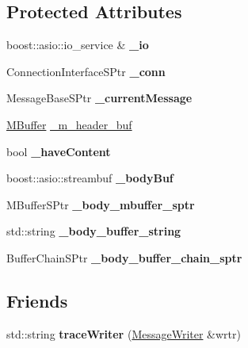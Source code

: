 \subsection*{Protected Attributes}
\begin{DoxyCompactItemize}
\item 
\mbox{\label{class_message_writer_aaf28fbb61f0fc9783fab731d12f06aed}} 
boost\+::asio\+::io\+\_\+service \& {\bfseries \+\_\+io}
\item 
\mbox{\label{class_message_writer_a2fa38a10a98a06bec22a59489f582965}} 
Connection\+Interface\+S\+Ptr {\bfseries \+\_\+conn}
\item 
\mbox{\label{class_message_writer_a6b04facc589bab6acca0c85ba5e481ef}} 
Message\+Base\+S\+Ptr {\bfseries \+\_\+current\+Message}
\item 
\hyperlink{struct_m_buffer}{M\+Buffer} \hyperlink{class_message_writer_a77fcbd1fa4556cb745536c5a1eee6d70}{\+\_\+m\+\_\+header\+\_\+buf}
\item 
\mbox{\label{class_message_writer_a8a3c2444eb3fd4634a8d1e286fce272d}} 
bool {\bfseries \+\_\+have\+Content}
\item 
\mbox{\label{class_message_writer_af0bccbe32eecf55f98461ffdd795aac3}} 
boost\+::asio\+::streambuf {\bfseries \+\_\+body\+Buf}
\item 
\mbox{\label{class_message_writer_a9a5a72be97d50ee812d04394e138f628}} 
M\+Buffer\+S\+Ptr {\bfseries \+\_\+body\+\_\+mbuffer\+\_\+sptr}
\item 
\mbox{\label{class_message_writer_a3ef2348f35aeeb1d95c5aeb0d037976e}} 
std\+::string {\bfseries \+\_\+body\+\_\+buffer\+\_\+string}
\item 
\mbox{\label{class_message_writer_a151a30d9725e35d4c25dcc000a247570}} 
Buffer\+Chain\+S\+Ptr {\bfseries \+\_\+body\+\_\+buffer\+\_\+chain\+\_\+sptr}
\end{DoxyCompactItemize}
\subsection*{Friends}
\begin{DoxyCompactItemize}
\item 
\mbox{\label{class_message_writer_a3740b08ba1b836dbf6a6ca2d3e4fadf7}} 
std\+::string {\bfseries trace\+Writer} (\hyperlink{class_message_writer}{Message\+Writer} \&wrtr)
\end{DoxyCompactItemize}


